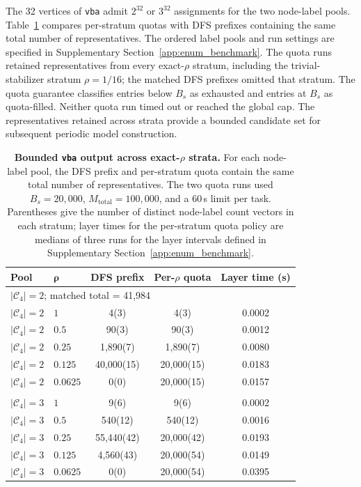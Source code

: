 \documentclass[a5paper, 10pt]{article}
\begin{document}
The 32 vertices of \texttt{vba} admit $2^{32}$ or $3^{32}$ assignments for the two node-label pools. Table~\ref{tab:vba_bounded} compares per-stratum quotas with DFS prefixes containing the same total number of representatives. The ordered label pools and run settings are specified in Supplementary Section~\ref{app:enum_benchmark}. The quota runs retained representatives from every exact-$\rho$ stratum, including the trivial-stabilizer stratum $\rho=1/16$; the matched DFS prefixes omitted that stratum. The quota guarantee classifies entries below $B_s$ as exhausted and entries at $B_s$ as quota-filled. Neither quota run timed out or reached the global cap. The representatives retained across strata provide a bounded candidate set for subsequent periodic model construction.
\begin{table}[H]
\centering
\scriptsize
\setlength{\tabcolsep}{2.5mm}
\renewcommand{\arraystretch}{1.2}
\caption{\textbf{Bounded \texttt{vba} output across exact-$\rho$ strata.} For each node-label pool, the DFS prefix and per-stratum quota contain the same total number of representatives. The two quota runs used $B_s=20{,}000$, $M_{\mathrm{total}}=100{,}000$, and a 60\,s limit per task. Parentheses give the number of distinct node-label count vectors in each stratum; layer times for the per-stratum quota policy are medians of three runs for the layer intervals defined in Supplementary Section~\ref{app:enum_benchmark}.}
\label{tab:vba_bounded}
\begin{tabular}{llccc}
\toprule
\textbf{Pool} & $\boldsymbol{\rho}$ & \textbf{DFS prefix} & \textbf{Per-$\rho$ quota} & \textbf{Layer time (s)} \\
\midrule
\multicolumn{5}{l}{$|\mathcal{C}_4|=2$; matched total = 41,984} \\
$|\mathcal C_4|=2$ & $1$ & 4\;(3) & 4\;(3) & 0.0002 \\
$|\mathcal C_4|=2$ & $0.5$ & 90\;(3) & 90\;(3) & 0.0012 \\
$|\mathcal C_4|=2$ & $0.25$ & 1,890\;(7) & 1,890\;(7) & 0.0080 \\
$|\mathcal C_4|=2$ & $0.125$ & 40,000\;(15) & 20,000\;(15) & 0.0183 \\
$|\mathcal C_4|=2$ & $0.0625$ & 0\;(0) & 20,000\;(15) & 0.0157 \\
\addlinespace
\multicolumn{5}{l}{$|\mathcal{C}_4|=3$; matched total = 60,549} \\
$|\mathcal C_4|=3$ & $1$ & 9\;(6) & 9\;(6) & 0.0002 \\
$|\mathcal C_4|=3$ & $0.5$ & 540\;(12) & 540\;(12) & 0.0016 \\
$|\mathcal C_4|=3$ & $0.25$ & 55,440\;(42) & 20,000\;(42) & 0.0193 \\
$|\mathcal C_4|=3$ & $0.125$ & 4,560\;(43) & 20,000\;(54) & 0.0149 \\
$|\mathcal C_4|=3$ & $0.0625$ & 0\;(0) & 20,000\;(54) & 0.0395 \\
\bottomrule
\end{tabular}%
\end{table}
\end{document}
